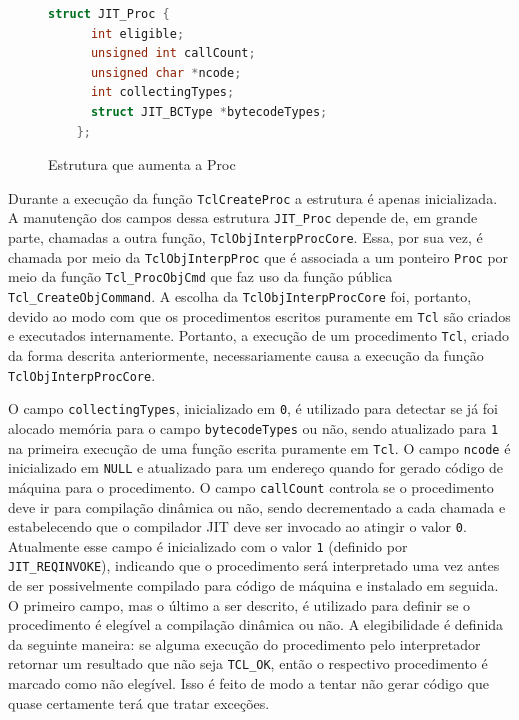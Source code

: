 \begin{figure}[h]
  \centering
  \begin{lstlisting}[language=C]
    struct JIT_Proc {
      int eligible;
      unsigned int callCount;
      unsigned char *ncode;
      int collectingTypes;
      struct JIT_BCType *bytecodeTypes;
    };
  \end{lstlisting}
  \caption{\label{jitproc}Estrutura que aumenta a Proc}
\end{figure}

Durante a execução da função \verb!TclCreateProc! a estrutura é apenas
inicializada. A manutenção dos campos dessa estrutura \verb!JIT_Proc!
depende de, em grande parte, chamadas a outra função,
\verb!TclObjInterpProcCore!. Essa,
por sua vez, é chamada por meio da \verb!TclObjInterpProc! que é associada
a um ponteiro \verb!Proc! por meio da função \verb!Tcl_ProcObjCmd! que
faz uso da função pública \verb!Tcl_CreateObjCommand!. A escolha da
\verb!TclObjInterpProcCore! foi, portanto, devido ao modo com que os
procedimentos escritos puramente em \texttt{Tcl} são criados
e executados internamente.
Portanto, a execução de um procedimento \texttt{Tcl},
criado da forma descrita anteriormente, necessariamente causa a
execução da função \verb!TclObjInterpProcCore!.

O campo \verb!collectingTypes!, inicializado em \verb!0!, é utilizado para
detectar se já foi alocado memória para o campo \verb!bytecodeTypes!
ou não, sendo atualizado para \verb!1! na primeira execução de uma
função escrita puramente em \texttt{Tcl}. O campo \verb!ncode! é
inicializado em \verb!NULL! e atualizado para um endereço quando for
gerado código de máquina para o procedimento. O campo \verb!callCount!
controla se o procedimento deve ir para compilação dinâmica ou não,
sendo decrementado a cada chamada e estabelecendo que o compilador JIT
deve ser invocado ao atingir
o valor \verb!0!. Atualmente esse campo é inicializado com o valor
\verb!1! (definido por \verb!JIT_REQINVOKE!),
indicando que o procedimento será interpretado uma vez antes
de ser possivelmente compilado para código de máquina e instalado em
seguida. O primeiro
campo, mas o último a ser descrito, é utilizado para definir se o
procedimento é elegível a compilação dinâmica ou não. A elegibilidade
é definida da seguinte maneira: se alguma execução do procedimento pelo
interpretador retornar um resultado que não seja \verb!TCL_OK!, então
o respectivo procedimento é marcado como não elegível. Isso é feito de
modo a tentar não gerar código que quase certamente terá que
tratar exceções.

